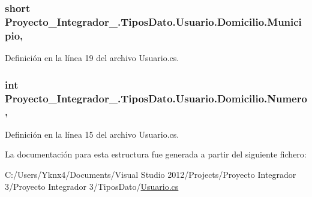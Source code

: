\hypertarget{struct_proyecto___integrador__3_1_1_tipos_dato_1_1_usuario_1_1_domicilio_a909e9dfc0615a13937e6c4134dca57c5}{
\subsubsection[{Municipio}]{\setlength{\rightskip}{0pt plus 5cm}short Proyecto\-\_\-\-Integrador\-\_.\-Tipos\-Dato.\-Usuario.\-Domicilio.\-Municipio\hspace{0.3cm}{\ttfamily [get]}, {\ttfamily [set]}}}\label{struct_proyecto___integrador__3_1_1_tipos_dato_1_1_usuario_1_1_domicilio_a909e9dfc0615a13937e6c4134dca57c5}


Definición en la línea 19 del archivo Usuario.\-cs.

\hypertarget{struct_proyecto___integrador__3_1_1_tipos_dato_1_1_usuario_1_1_domicilio_a31d02de9239bc44c3da8022fc36419e1}{
\subsubsection[{Numero}]{\setlength{\rightskip}{0pt plus 5cm}int Proyecto\-\_\-\-Integrador\-\_.\-Tipos\-Dato.\-Usuario.\-Domicilio.\-Numero\hspace{0.3cm}{\ttfamily [get]}, {\ttfamily [set]}}}\label{struct_proyecto___integrador__3_1_1_tipos_dato_1_1_usuario_1_1_domicilio_a31d02de9239bc44c3da8022fc36419e1}


Definición en la línea 15 del archivo Usuario.\-cs.



La documentación para esta estructura fue generada a partir del siguiente fichero\-:\begin{DoxyCompactItemize}
\item 
C\-:/\-Users/\-Yknx4/\-Documents/\-Visual Studio 2012/\-Projects/\-Proyecto Integrador 3/\-Proyecto Integrador 3/\-Tipos\-Dato/\hyperlink{_usuario_8cs}{Usuario.\-cs}\end{DoxyCompactItemize}
